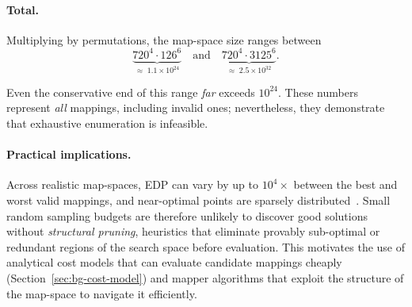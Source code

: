 \paragraph{Total.}
Multiplying by permutations, the map-space size ranges between
\[
  \underbrace{720^{4} \cdot 126^{6}}_{\approx\;1.1 \times 10^{24}}
  \quad\text{and}\quad
  \underbrace{720^{4} \cdot 3125^{6}}_{\approx\;2.5 \times 10^{32}}.
\]

Even the conservative end of this range \emph{far} exceeds
$10^{24}$.
These numbers represent \emph{all} mappings, including invalid ones;
nevertheless, they demonstrate that exhaustive enumeration is
infeasible.

\paragraph{Practical implications.}
Across realistic map-spaces, EDP can vary by up to $10^{4}\times$
between the best and worst valid mappings, and near-optimal points are
sparsely distributed~\cite{kao2020gamma}.
Small random sampling budgets are therefore unlikely to discover good
solutions without \emph{structural pruning}, heuristics that
eliminate provably sub-optimal or redundant regions of the search
space before evaluation.
This motivates the use of analytical cost models that can evaluate
candidate mappings cheaply (Section~\ref{sec:bg-cost-model}) and
mapper algorithms that exploit the structure of the map-space to
navigate it efficiently.